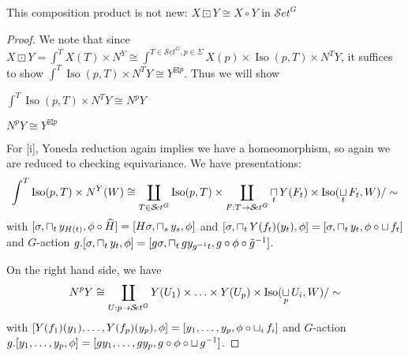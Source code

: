 \documentclass{report}
\newenvironment{renumerate}
{\begin{list}{\roman{enumi}.}
    {\itemsep=0in\usecounter{enumi}}
  }{\end{list}}
\newcommand{\Set}{\text{$\mathcal{S}\!et$}}
\DeclareMathOperator{\Iso}{Iso}
\newcommand{\icap}{\operatornamewithlimits{\sqcap}}
\newcommand{\ico}{\operatornamewithlimits{\sqcup}}
\renewcommand{\hat}[1]{\text{$\widehat{#1}$}}
\begin{document}
\begin{prop}
  This composition product is not new: $X\boxdot Y \cong X\circ Y$ in $\Set^G$
\end{prop}
\begin{proof}
  We note that since $X\boxdot Y = \int^TX(T)\times N^Y \cong \int^{T\in\Set^G, p\in \Sigma}X(p)\times \Iso(p,T) \times N^TY$, it suffices to show $\int^T\Iso(p,T)\times N^TY \cong Y^{\boxtimes p}$. Thus we will show
  \begin{renumerate}%
  \item $\int^T\Iso(p,T)\times N^TY \cong N^pY$
  \item $N^pY \cong Y^{\boxtimes p}$
  \end{renumerate}

  For [i], Yoneda reduction again implies we have a homeomorphism, so again we are reduced to checking equivariance. We have presentations:
  \[\int^T\Iso(p,T)\times N^Y(W) \cong \coprod_{T\in\Set^G}\Iso(p,T)\times\coprod_{F:T\to \Set^G}\icap_tY(F_t)\times \Iso(\ico_tF_t,W)/\sim\]
  with $[\sigma,\icap_ty_{H(t)},\phi\circ \hat H] = [H\sigma,\icap_sy_s,\phi]$ and $[\sigma,\icap_tY(f_t)(y_t),\phi] = [\sigma,\icap_ty_t,\phi\circ \ico f_t]$ and $G$-action $g.[\sigma,\icap_ty_t,\phi] = [g\sigma,\icap_tgy_{g^{-1}t},g\circ\phi\circ\tilde g^{-1}]$.

  On the right hand side, we have
  \[N^pY \cong \coprod_{U: p\to \Set^G}Y(U_1)\times\ldots \times Y(U_p)\times \Iso(\ico_pU_i,W)/\sim\]
  with $[Y(f_1)(y_1),\ldots, Y(f_p)(y_p),\phi] = [y_1,\ldots, y_p,\phi\circ \ico_if_i]$ and $G$-action $g.[y_1,\ldots, y_p,\phi] = [gy_1,\ldots, gy_p,g\circ\phi\circ \ico g^{-1}]$. 


\end{proof}
\end{document}
